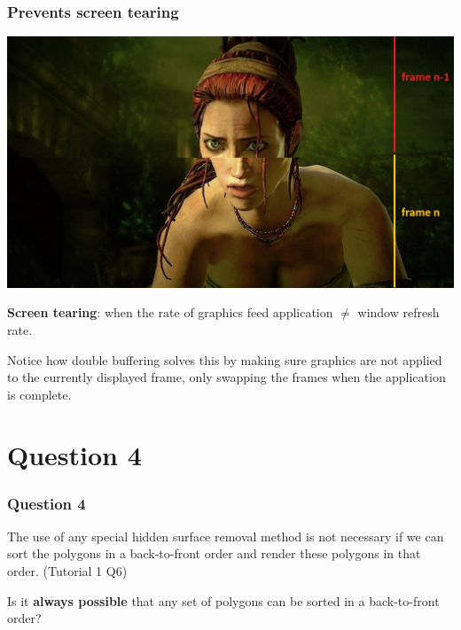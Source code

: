 \documentclass{beamer}
\begin{document}
\begin{frame}
    \frametitle{Prevents screen tearing}

    \begin{center}
        \includegraphics[scale=0.3]{screen-tear.jpg}
    \end{center}

    \begin{tcolorbox}
        \textbf{Screen tearing}: 
        when the rate of graphics feed application $\neq$ window refresh rate.
    \end{tcolorbox}

    Notice how double buffering solves this by making sure graphics are not applied to the currently displayed frame,
    only swapping the frames when the application is complete.

\end{frame}

\section{Question 4}

\begin{frame}
    \frametitle{Question 4}
    The use of any special hidden surface removal method is not necessary if we can sort the polygons in a back-to-front order 
    and render these polygons in that order. (Tutorial 1 Q6)\\

    \vspace{1em}
    
    Is it \textbf{always possible} that any set of polygons can be sorted in a back-to-front order?
\end{frame}
\end{document}
